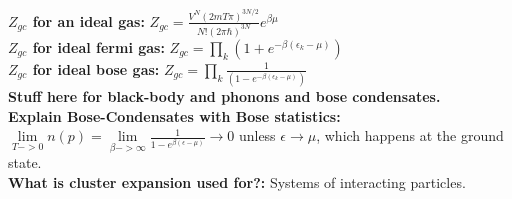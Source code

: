\documentclass[12pt]{extarticle}
\begin{document}
\textbf{$Z_{gc}$ for an ideal gas:} $Z_{gc} = \frac{V^N(2mT\pi)^{3N/2}}{N!(2\pi\hbar)^{3N}} e^{\beta\mu}$ \\
\textbf{$Z_{gc}$ for ideal fermi gas:} $Z_{gc} = \prod\limits_k \left(1+e^{-\beta(\epsilon_k-\mu)}\right)$ \\
\textbf{$Z_{gc}$ for ideal bose gas:} $Z_{gc} = \prod\limits_k \frac{1}{\left(1-e^{-\beta(\epsilon_k-\mu)}\right)}$ \\
\textbf{Stuff here for black-body and phonons and bose condensates.} \\
\textbf{Explain Bose-Condensates with Bose statistics:} $\lim\limits_{T->0}n(p) = \lim\limits_{\beta->\infty} \frac{1}{1-e^{\beta(\epsilon-\mu)}} \rightarrow 0$ unless $\epsilon \rightarrow \mu$, which happens at the ground state. \\
\textbf{What is cluster expansion used for?:} Systems of interacting particles. \\
\end{document}
